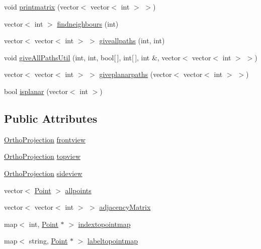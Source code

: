 \begin{DoxyCompactItemize}
void \hyperlink{class_projection2_d_a209abc191321c5bdd970c57c68dd0ac8}{printmatrix} (vector$<$ vector$<$ int $>$ $>$)
\item 
vector$<$ int $>$ \hyperlink{class_projection2_d_ac86b5c70c7ad7d1e3e3df3f41161bec7}{findneighbours} (int)
\item 
vector$<$ vector$<$ int $>$ $>$ \hyperlink{class_projection2_d_a12296093badead168e68c689df080332}{giveallpaths} (int, int)
\item 
void \hyperlink{class_projection2_d_a71696fe8650908a7c0b98e4059d1ecf9}{give\+All\+Paths\+Util} (int, int, bool\mbox{[}$\,$\mbox{]}, int\mbox{[}$\,$\mbox{]}, int \&, vector$<$ vector$<$ int $>$ $>$)
\item 
vector$<$ vector$<$ int $>$ $>$ \hyperlink{class_projection2_d_af623f07691c744da9b1c2df473df858a}{giveplanarpaths} (vector$<$ vector$<$ int $>$ $>$)
\item 
bool \hyperlink{class_projection2_d_a4b86c26f97d2a91f7fde20fa7ab51092}{isplanar} (vector$<$ int $>$)
\end{DoxyCompactItemize}
\subsection*{Public Attributes}
\begin{DoxyCompactItemize}
\item 
\hyperlink{class_ortho_projection}{Ortho\+Projection} \hyperlink{class_projection2_d_a1eb4d010190b1bd62bf0f9c4e4afc88a}{frontview}
\item 
\hyperlink{class_ortho_projection}{Ortho\+Projection} \hyperlink{class_projection2_d_a90079954379a766f60ba01ad393327ab}{topview}
\item 
\hyperlink{class_ortho_projection}{Ortho\+Projection} \hyperlink{class_projection2_d_a82c9e3f197b07ffe9a10f59de60edbee}{sideview}
\item 
vector$<$ \hyperlink{class_point}{Point} $>$ \hyperlink{class_projection2_d_aacafd767e5289005e7ec5d48c791d02f}{allpoints}
\item 
vector$<$ vector$<$ int $>$ $>$ \hyperlink{class_projection2_d_a0a4be368b0a7233a1aa93efe17c7314e}{adjacency\+Matrix}
\item 
map$<$ int, \hyperlink{class_point}{Point} $\ast$ $>$ \hyperlink{class_projection2_d_a08675aad4022218dc78dd54187be18a9}{indextopointmap}
\item 
map$<$ string, \hyperlink{class_point}{Point} $\ast$ $>$ \hyperlink{class_projection2_d_a0afd92ccd321bc86e6e019b4bec99fc8}{labeltopointmap}
\end{DoxyCompactItemize}


